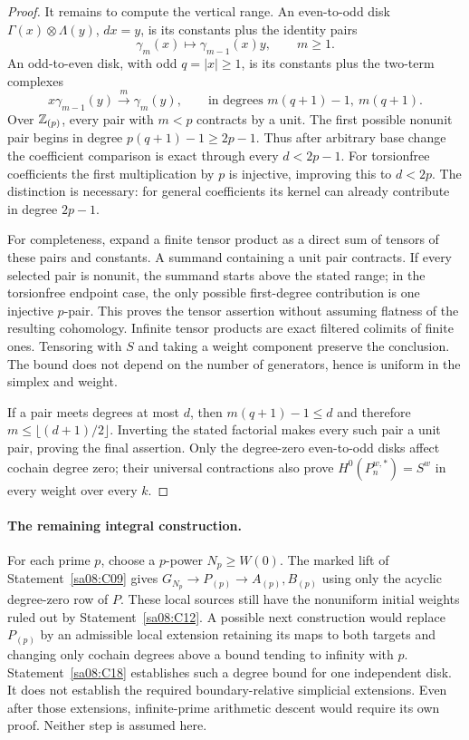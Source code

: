 \begin{proof}
It remains to compute the vertical range. An even-to-odd disk
$\Gamma(x)\otimes\Lambda(y)$, $dx=y$, is its constants plus
the identity pairs
\[
 \gamma_m(x)\longmapsto\gamma_{m-1}(x)y,
 \qquad m\geq1.
\]
An odd-to-even disk, with odd $q=|x|\geq1$, is its constants
plus the two-term complexes
\[
 x\gamma_{m-1}(y)\xrightarrow{\ m\ }\gamma_m(y),
 \qquad
 \text{in degrees }m(q+1)-1,\ m(q+1).
\]
Over $\mathbb Z_{(p)}$, every pair with $m<p$ contracts by a unit.
The first possible nonunit pair begins in degree
$p(q+1)-1\geq2p-1$. Thus after arbitrary base change the
coefficient comparison is exact through every $d<2p-1$.
For torsionfree coefficients the first multiplication by $p$ is
injective, improving this to $d<2p$. The distinction is necessary:
for general coefficients its kernel can already contribute in
degree $2p-1$.

For completeness, expand a finite tensor product as a direct sum
of tensors of these pairs and constants. A summand containing a
unit pair contracts. If every selected pair is nonunit, the summand
starts above the stated range; in the torsionfree endpoint case,
the only possible first-degree contribution is one injective
$p$-pair. This proves the tensor assertion without assuming
flatness of the resulting cohomology. Infinite tensor products
are exact filtered colimits of finite ones. Tensoring with $S$
and taking a weight component preserve the conclusion. The bound
does not depend on the number of generators, hence is uniform in
the simplex and weight.

If a pair meets degrees at most $d$, then
$m(q+1)-1\leq d$ and therefore
$m\leq\lfloor(d+1)/2\rfloor$. Inverting the stated factorial
makes every such pair a unit pair, proving the final assertion.
Only the degree-zero even-to-odd disks affect cochain degree zero;
their universal contractions also prove $H^0(P_n^{w,*})=S^w$
in every weight over every $k$.
\end{proof}

\paragraph{The remaining integral construction.}
For each prime $p$, choose a $p$-power $N_p\geq W(0)$.
The marked lift of Statement~\ref{sa08:C09} gives
$G_{N_p}\to P_{(p)}\to A_{(p)},B_{(p)}$ using only the
acyclic degree-zero row of $P$. These local sources still have
the nonuniform initial weights ruled out by
Statement~\ref{sa08:C12}. A possible next construction would
replace $P_{(p)}$ by an admissible local extension retaining its
maps to both targets and changing only cochain degrees above a
bound tending to infinity with $p$. Statement~\ref{sa08:C18}
establishes such a degree bound for one independent disk.
It does not establish the required boundary-relative simplicial
extensions. Even after those extensions, infinite-prime arithmetic
descent would require its own proof. Neither step is assumed here.
